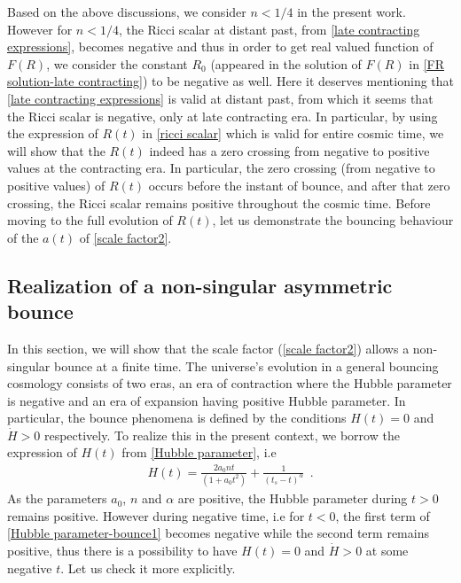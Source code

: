 \documentclass{article}
\begin{document}
Based on the above discussions, we consider $n < 1/4$ in the present work. However for $n < 1/4$, the Ricci scalar at distant past, from 
\ref{late contracting expressions}, becomes negative and thus in order to get real valued function of $F(R)$, we consider the constant 
$R_0$ (appeared in the solution of $F(R)$ in \ref{FR solution-late contracting}) to be negative as well. Here it deserves mentioning that 
\ref{late contracting expressions} is valid at distant past, from which it seems that 
the Ricci scalar is negative, only at late contracting era. In particular, by using the expression of $R(t)$ in \ref{ricci scalar} which is valid 
for entire cosmic time, we will show that the $R(t)$ indeed has a zero crossing from negative to 
positive values at the contracting era. In particular, the zero crossing (from negative to positive values) 
of $R(t)$ occurs before the instant of bounce, and after that zero crossing, the Ricci scalar remains positive throughout the cosmic time. Before moving 
to the full evolution of $R(t)$, let us demonstrate the bouncing behaviour of the $a(t)$ of \ref{scale factor2}.

\subsection{Realization of a non-singular asymmetric bounce}\label{sec-bounce-realization}
In this section, we will show that the scale factor (\ref{scale factor2}) allows a non-singular bounce at a finite time. The universe's evolution 
in a general bouncing cosmology consists of two eras, an era of contraction where the Hubble parameter is negative and an era of expansion having 
positive Hubble parameter. In particular, the bounce phenomena is defined by the conditions $H(t) = 0$ and $\dot{H} > 0$ respectively. 
To realize this in the present context, we borrow the expression of $H(t)$ from \ref{Hubble parameter}, i.e
\begin{eqnarray}
 H(t) = \frac{2a_0nt}{\left(1 + a_0t^2\right)} + \frac{1}{\left(t_s - t\right)^{\alpha}}~~.
 \label{Hubble parameter-bounce1}
\end{eqnarray}
As the parameters $a_0$, $n$ and $\alpha$ are positive, the Hubble parameter during $t > 0$ remains positive. However during negative time, 
i.e for $t < 0$, the first term of \ref{Hubble parameter-bounce1} becomes negative while the second term remains positive, 
thus there is a possibility to have $H(t) = 0$ and $\dot{H} > 0$ at some negative $t$. Let us check it more explicitly.
\end{document}
